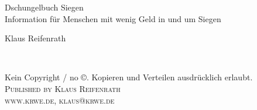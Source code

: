 
\begingroup
\thispagestyle{empty}
\centering
\vspace*{9cm}
\par\normalfont\fontsize{35}{35}\sffamily\selectfont
Dschungelbuch Siegen\\ {\LARGE Information für Menschen mit wenig Geld in und um Siegen}\par %
\vspace*{1cm}
{\Huge Klaus Reifenrath}\par %
\endgroup


\newpage
~\vfill
\thispagestyle{empty}

\noindent Kein Copyright / no \copyright. Kopieren und Verteilen ausdrücklich erlaubt.\\ %

\noindent \textsc{Published by Klaus Reifenrath}\\ %

\noindent \textsc{www.krwe.de, klaus@krwe.de}\\ %




